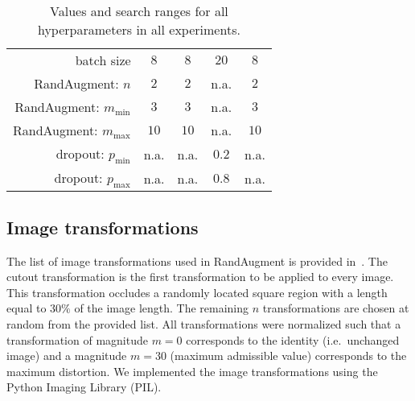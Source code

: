 \begin{table}
\begin{tabular}{r|cccc}
		batch size                          & $8$                   & $8$                   & $20$  & $8$                  \\ \hdashline[0.5pt/5pt]
		RandAugment: $n$                    & $2$                   & $2$                   & n.a. & $2$                   \\ \hdashline[0.5pt/5pt]
		RandAugment: $m_{\text{min}}$       & $3$                   & $3$                   & n.a. &  $3$                 \\ \hdashline[0.5pt/5pt]
		RandAugment: $m_{\text{max}}$       & $10$                  & $10$                  & n.a.  &  $10$                \\ \hdashline[0.5pt/5pt]
		dropout: $p_{\text{min}}$           & n.a.                  & n.a.                  & $0.2$  & n.a.                 \\ \hdashline[0.5pt/5pt]
		dropout: $p_{\text{max}}$           & n.a.                  & n.a.                  & $0.8$  & n.a.
	\end{tabular}
	\caption{Values and search ranges for all hyperparameters in all experiments.}
	\label{tab:hyperparameters}
\end{table}


\subsection{Image transformations}
\label{sec:img_transf}
The list of image transformations used in RandAugment is provided in~. The cutout transformation is the first transformation to be applied to every image. This transformation occludes a randomly located square region with a length equal to $30\%$ of the image length. The remaining $n$ transformations are chosen at random from the provided list. All transformations were normalized such that a transformation of magnitude $m = 0$ corresponds to the identity (i.e.\ unchanged image) and a magnitude $m = 30$ (maximum admissible value) corresponds to the maximum distortion. We implemented the image transformations using the Python Imaging Library (PIL).

